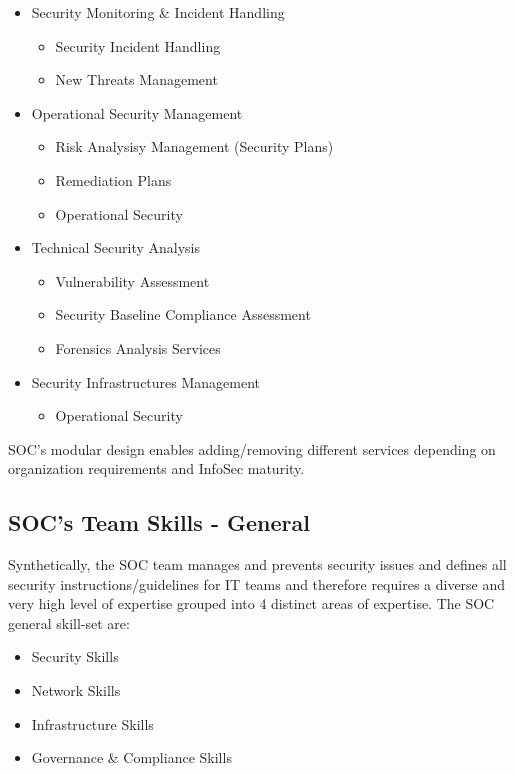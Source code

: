 \documentclass[a4]{article}
\begin{document}
\begin{multicols}{3}
\begin{itemize}
    \item Security Monitoring \& Incident Handling
    \begin{itemize}
        \item Security Incident Handling
        \item New Threats Management
    \end{itemize}
    \item Operational Security Management
    \begin{itemize}
        \item Risk Analysisy Management (Security Plans)
        \item Remediation Plans
        \item Operational Security
    \end{itemize}
    \item Technical Security Analysis
    \begin{itemize}
        \item Vulnerability Assessment
        \item Security Baseline Compliance Assessment
        \item Forensics Analysis Services
    \end{itemize}
    \item Security Infrastructures Management
    \begin{itemize}
        \item Operational Security
    \end{itemize}
\end{itemize}
\noindent
SOC’s modular design enables adding/removing different services depending on organization requirements and
InfoSec maturity.

\subsection{SOC's Team Skills - General}
Synthetically, the SOC team manages and prevents security issues and defines all security instructions/guidelines
for IT teams and therefore requires a diverse and very high level of expertise grouped into 4 distinct areas 
of expertise.
\noindent
The SOC general skill-set are:
\begin{itemize}
    \item Security Skills
    \item Network Skills
    \item Infrastructure Skills
    \item Governance \& Compliance Skills
\end{itemize}


\end{multicols}
\end{document}
